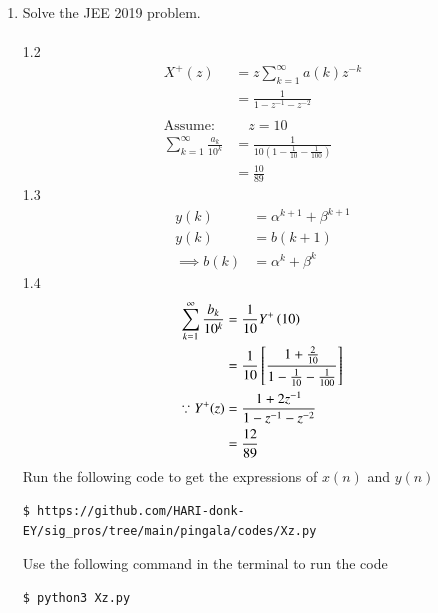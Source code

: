 \documentclass[journal,12pt,twocolumn]{IEEEtran}
\renewcommand\thesection{\arabic{section}}
\begin{document}
\begin{enumerate}[label=\thesection.\arabic*,ref=\thesection.\theenumi]
		\item 
			Solve the JEE 2019 problem.\\
		\solution\\
			1.2\\
			\begin{align}
				X^{+}(z) & = z\sum_{k=1}^{\infty} a(k) z^{-k}\\ & =\frac{1}{1-z^{-1}-z^{-2}}\\ \ \nonumber \\
				\text{Assume:}& \quad z=10\\
				\sum_{k=1}^{\infty} \frac{a_k}{10^k} & = \frac{1}{10 \left(1-\frac{1}{10}-\frac{1}{100}\right)}\\
				& = \frac{10}{89}
			\end{align}
			1.3\\
			\begin{align}
				y(k) & =\alpha^{k+1}+\beta^{k+1}\\
				y(k) & =b(k+1)\\
				\implies b(k) & =\alpha^{k}+\beta^{k}
			\end{align}
			1.4\\
			\begin{align}
				\sum_{k=1}^{\infty}\frac{b_k}{10^k} & = \frac{1}{10}Y^{+}\left({10}\right)\\
				& = \frac{1}{10}\left[\frac{1+\frac{2}{10}}{1-\frac{1}{10}-\frac{1}{100}}\right]\\
				\because Y^{+}(z) & =\frac{1+2z^{-1}}{1-z^{-1}-z^{-2}}\\
				& = \frac{12}{89}
			\end{align}
			Run the following code to get the expressions of $x(n)$ and $y(n)$
			\begin{lstlisting}
$ https://github.com/HARI-donk-EY/sig_pros/tree/main/pingala/codes/Xz.py
			\end{lstlisting}
			Use the following command in the terminal to run the code
			\begin{lstlisting}
$ python3 Xz.py
			\end{lstlisting}

\end{enumerate}
\end{document}
